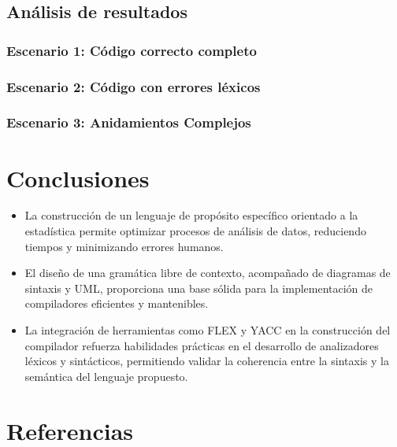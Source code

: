 \documentclass{article}
\begin{document}
\subsection{Análisis de resultados}

\subsubsection{Escenario 1: Código correcto completo}



\subsubsection{Escenario 2: Código con errores léxicos}


\subsubsection{Escenario 3:  Anidamientos Complejos }



\section{Conclusiones}

\begin{itemize}
    \item La construcción de un lenguaje de propósito específico orientado a la estadística permite optimizar procesos de análisis de datos, reduciendo tiempos y minimizando errores humanos.
    
    \item El diseño de una gramática libre de contexto, acompañado de diagramas de sintaxis y UML, proporciona una base sólida para la implementación de compiladores eficientes y mantenibles.
    
    \item La integración de herramientas como FLEX y YACC en la construcción del compilador refuerza habilidades prácticas en el desarrollo de analizadores léxicos y sintácticos, permitiendo validar la coherencia entre la sintaxis y la semántica del lenguaje propuesto.
  
\end{itemize}


\section{Referencias}
\renewcommand{\refname}{}
\end{document}
